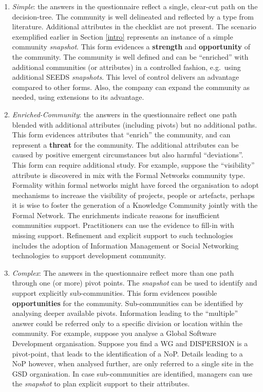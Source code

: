 \begin{enumerate}
\item \emph{Simple}: the answers in the questionnaire reflect a single, clear-cut path on the decision-tree. The community is well delineated and reflected by a type from literature. Additional attributes in the checklist are not present. The scenario exemplified earlier in Section \ref{intro} represents an instance of a simple community \emph{snapshot}. This form evidences a \textbf{strength} and \textbf{opportunity} of the community. The community is well defined and can be ``enriched'' with additional communities (or attributes) in a controlled fashion, e.g.~using additional SEEDS \emph{\emph{snapshots}}. This level of control delivers an advantage compared to other forms. Also, the company can expand the community as needed, using extensions to its advantage.

\item \emph{Enriched-Community}: the answers in the questionnaire reflect one path blended with additional attributes (including pivots) but no additional paths. This form evidences attributes that ``enrich'' the community, and can represent a \textbf{threat} for the community. The additional attributes can be caused by positive emergent circumstances but also harmful ``deviations''. This form can require additional study.
For example, suppose the ``visibility'' attribute is discovered in mix with the Formal Networks community type. Formality within formal networks might have forced the organisation to adopt mechanisms to increase the visibility of projects, people or artefacts, perhaps it is wise to foster the generation of a Knowledge Community jointly with the Formal Network. The enrichments indicate reasons for insufficient communities support. Practitioners can use the evidence to fill-in with missing support. Refinement and explicit support to such technologies includes the adoption of Information Management or Social Networking technologies \cite{eis,eim} to support development community.

\item \emph{Complex}: The answers in the questionnaire reflect more than one path through one (or more) pivot points. The \emph{snapshot} can be used to identify and support explicitly sub-communities. This form evidences possible \textbf{opportunities} for the community. Sub-communities can be identified by analysing deeper available pivots. Information leading to the ``multiple'' answer could be referred only to a specific division or location within the community. For example, suppose you analyse a Global Software Development organisation. Suppose you find a WG and DISPERSION is a pivot-point, that leads to the identification of a NoP. Details leading to a NoP however, when analysed further, are only referred to a single site in the GSD organisation. In case sub-communities are identified, managers can use the \emph{snapshot} to plan explicit support to their attributes.


\end{enumerate}
